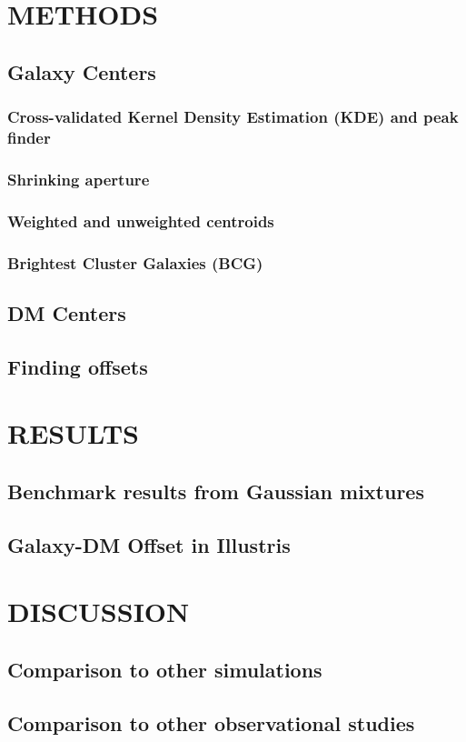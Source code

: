 \documentclass[letterpaper,useAMS,usenatbib]{mn2e}
\begin{document}
\section{METHODS} 
\subsection{Galaxy Centers}
\subsubsection{Cross-validated Kernel Density Estimation (KDE) and peak finder} 
\subsubsection{Shrinking aperture}
\subsubsection{Weighted and unweighted centroids}
\subsubsection{Brightest Cluster Galaxies (BCG)}
\subsection{DM Centers}
\subsection{Finding offsets} 
\section{RESULTS} 
\subsection{Benchmark results from Gaussian mixtures} 
\subsection{Galaxy-DM Offset in Illustris}
\section{DISCUSSION}
\subsection{Comparison to other simulations}
\subsection{Comparison to other observational studies}
\end{document}
